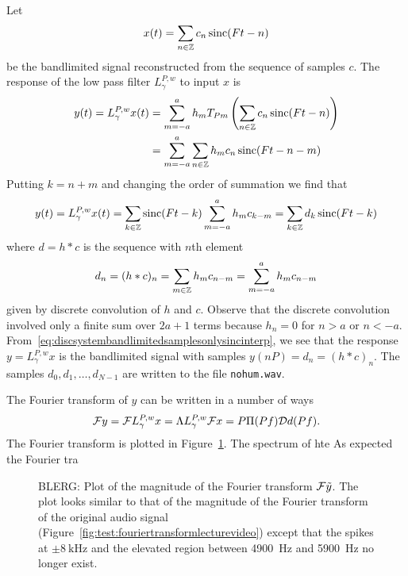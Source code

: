 \begin{test}
Let 
\[
x(t) = \sum_{n \in {\mathbb Z}} c_n \operatorname{sinc}(F t - n)
\]
be the bandlimited signal reconstructed from the sequence of samples $c$.  The response of the low pass filter $L_\gamma^{P,w}$ to input $x$ is
\begin{align*}
y(t) = L_\gamma^{P,w} x(t) &= \sum_{m = -a}^a h_m T_{Pm} \left( \sum_{n \in {\mathbb Z}} c_n \operatorname{sinc}(F t - n) \right) \\
&= \sum_{m = -a}^a \sum_{n \in {\mathbb Z}} h_m  c_n \operatorname{sinc}(F t - n - m)  
\end{align*}
Putting $k = n+m$ and changing the order of summation we find that
\begin{equation}\label{eq:discsystembandlimitedsamplesonlysincinterp}
y(t) = L_\gamma^{P,w} x(t) = \sum_{k \in {\mathbb Z}} \operatorname{sinc}(F t - k) \sum_{m = -a}^a  h_m  c_{k-m} = \sum_{k \in {\mathbb Z}} d_k \operatorname{sinc}(F t - k)
\end{equation}
where $d = h * c$ is the sequence with $n$th element
\[
d_n = (h*c)_n = \sum_{m \in {\mathbb Z}} h_m c_{n-m} = \sum_{m = -a}^a h_m c_{n-m}
\]
given by discrete convolution of $h$ and $c$.  Observe that the discrete convolution involved only a finite sum over $2a+1$ terms because $h_n = 0$ for $n > a$ or $n < -a$.  From~\eqref{eq:discsystembandlimitedsamplesonlysincinterp}, we see that the response $y = L_\gamma^{P,w} x$ is the bandlimited signal with samples $y(nP) = d_n = (h*c)_n$.  The samples $d_0, d_1, \dots, d_{N-1}$ are written to the file \texttt{nohum.wav}.

The Fourier transform of $y$ can be written in a number of ways
\[
{\mathcal F} y = {\mathcal F} L_\gamma^{P,w} x = \Lambda  L_\gamma^{P,w} {\mathcal F} x = P \Pi(Pf) {\mathcal D} d(Pf).
\]
The Fourier transform is plotted in Figure~\ref{fig:test:firfilteredlecturevideo}.  The spectrum of hte   As expected the Fourier tra

\end{test}

\begin{figure}
\centering
\begin{shaded}
\caption{BLERG: Plot of the magnitude of the Fourier transform ${\mathcal F} \tilde{y}$.  The plot looks similar to that of the magnitude of the Fourier transform of the original audio signal (Figure~\ref{fig:test:fouriertransformlecturevideo}) except that the spikes at $\pm\SI{8}{\kilo\hertz}$ and the elevated region between \SI{4900}{\hertz} and \SI{5900}{\hertz} no longer exist.}\label{fig:test:firfilteredlecturevideo}
\end{shaded}
\end{figure}



